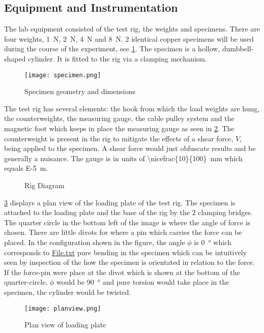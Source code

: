 \documentclass[authoryear]{tex/labreport}
\begin{document}
\subsection{Equipment and Instrumentation}
\label{subsec:equip}
The lab equipment consisted of the test rig, the weights and specimens. There are four weights, \SI{1}{\newton}, \SI{2}{\newton}, \SI{4}{\newton} and \SI{8}{\newton}. 2 identical copper specimens will be used during the course of the experiment, see \cref{fig:specimen}. The specimen is a hollow, dumbbell-shaped cylinder. It is fitted to the rig via a clamping mechanism. 
\begin{figure}[htb]
    \centering
    \texttt{[image: specimen.png]}
    \caption{Specimen geometry and dimensions \cite{gunt:2009}}
    \label{fig:specimen}
\end{figure}
The test rig has several elements: the hook from which the load weights are hung, the counterweights, the measuring gauge, the cable pulley system and the magnetic foot which keeps in place the measuring gauge as seen in \cref{fig:rig}. The counterweight is present in the rig to mitigate the effects of a shear force, $V$, being applied to the specimen. A shear force would just obfuscate results and be generally a nuisance. The gauge is in units of \SI[parse-numbers=false]{\nicefrac{10}{100}}{\milli\meter} which equals \SI{E-5}{\meter}. 
\begin{figure}[htb]
    \centering
    
    \caption{Rig Diagram \cite{gunt:2009}}
    \label{fig:rig}
\end{figure}
\cref{fig:loadingplate} displays a plan view of the loading plate of the test rig. The specimen is attached to the loading plate and the base of the rig by the 2 clamping bridges. The quarter circle in the bottom left of the image is where the angle of force is chosen. There are little divots for where a pin which carries the force can be placed. In the configuration shown in the figure, the angle $\phi$ is \SI{0}{\degree} which corresponds to \href{run:./file.txt}{File.txt} pure bending in the specimen which can be intuitively seen by inspection of the how the specimen is orientated in relation to the force. If the force-pin were place at the divot which is shown at the bottom of the quarter-circle, $\phi$ would be \SI{90}{\degree} and pure torsion would take place in the specimen, the cylinder would be twisted. 
\begin{figure}[htb]
    \centering
    \texttt{[image: planview.png]}
    \caption{Plan view of loading plate \cite{gunt:2009}}
    \label{fig:loadingplate}
\end{figure}
\end{document}
